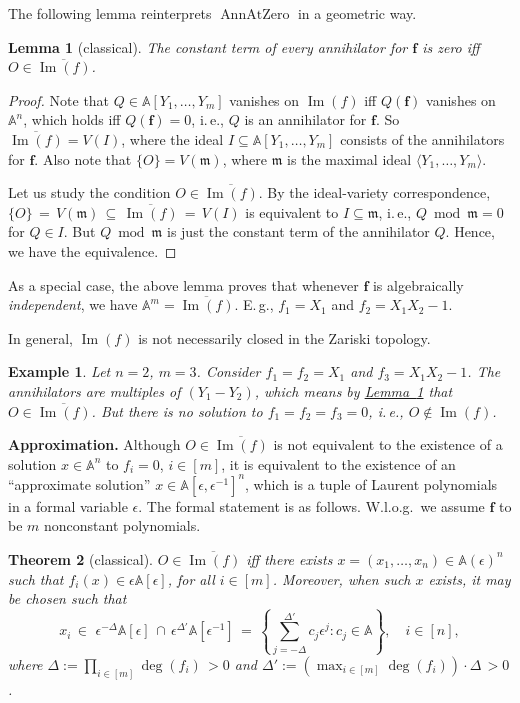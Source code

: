 \documentclass[11pt]{article}
\numberwithin{equation}{section}
\newtheorem{theorem}{Theorem}[section]
\newtheorem{lemma}[theorem]{Lemma}
\theoremstyle{definition}
\theoremstyle{plain}
\newcommand{\ie}{i.\,e.}
\newcommand{\Eg}{E.\,g.}
\newcommand{\expref}[2]{\hyperref[#2]{#1~\ref{#2}}}
\newtheorem{exmp}{Example}
\newcommand{\aff}{\mathbb{A}}
\DeclareMathOperator{\im}{\mathrm{Im}}
\newcommand{\ol}[1]{\overline{#1}}
\newcommand{\m}{\mathfrak{m}}
\DeclareMathOperator{\AnnAtZero}{\mathrm{AnnAtZero}\xspace} %
\begin{document}
The following lemma reinterprets $\AnnAtZero$ in a geometric way.
 \begin{lemma}[classical]\label{lem_geom}
 The constant term of every annihilator for $\mathbf f$ is zero iff $O\in \overline{\im(f)}$. %
 \end{lemma}
 \begin{proof}
 Note that %
 $Q\in \aff[Y_1,\dots,Y_m]$ vanishes on $\im(f)$ iff $Q(\mathbf f)$ vanishes on $\aff^n$, which holds iff $Q(\mathbf f)=0$, \ie, $Q$ is an annihilator for $\mathbf f$. So $\overline{\im(f)}=V(I)$, where the ideal $I\subseteq \aff[Y_1,\dots,Y_m]$ consists of the annihilators for $\mathbf f$. Also note that $\{O\}=V(\m)$, where $\m$ is the maximal ideal $\langle Y_1,\dots, Y_m\rangle$.

Let us study the condition $O\in \overline{\im(f)}$.
 By the ideal-variety correspondence, $\{O\} \,=\, V(\m) \,\subseteq\, \overline{\im(f)} \,=\, V(I)$ is equivalent to $I\subseteq \m$, \ie,  $Q\bmod \m=0$ for  $Q\in I$. But $Q\bmod \m$ is just the constant term of the annihilator $Q$. Hence, we have the equivalence.
 \end{proof}
 
%
%
As a special case,
%
the above lemma proves that
whenever $\mathbf f$
%
is  %
algebraically \emph{independent}, we have $\aff^m=\ol{\im(f)}$. \Eg, $f_1=X_1$ and $f_2=X_1 X_2-1$. 
%

In general, %
$\im(f)$ is not necessarily closed in the Zariski topology. 
\begin{exmp}\label{exmp_closure}
Let $n=2$, $m=3$. Consider $f_1=f_2=X_1$ and $f_3=X_1 X_2-1$. The annihilators are multiples of $(Y_1-Y_2)$, which means by \expref{Lemma}{lem_geom} that $O\in \ol{\im(f)}$. But there is no solution to $f_1=f_2=f_3=0$, \ie, $O\notin \im(f)$.
\end{exmp}

\noindent
\textbf{Approximation.} Although $O\in \overline{\im(f)}$ is not equivalent to the existence of a solution $x\in \aff^n$ to $f_i=0$, $i\in[m]$, it is equivalent to the existence of an  ``approximate solution'' $x\in \aff[\epsilon,\epsilon^{-1}]^n$, which is a tuple of Laurent polynomials in a formal variable $\epsilon$. The formal statement is as follows. W.l.o.g.\ we assume $\mathbf f$ to be $m$ nonconstant polynomials.

\begin{theorem}[classical]\label{thm_approx}
$O\in \overline{\im(f)}$ iff there exists $x=(x_1,\dots,x_n)\in \aff(\epsilon)^n$ such that $f_i(x)\in \epsilon \aff[\epsilon]$, for all $i\in [m]$. Moreover, when such $x$ exists, it may be chosen such that
\[
x_i \,\in\,\, \epsilon^{-\Delta} \aff[\epsilon] \,\cap\, \epsilon^{\Delta'} \aff[\epsilon^{-1}] \,=\, \left\{\sum_{j=-\Delta}^{\Delta'} c_j \epsilon^j: c_j\in \aff\right\}, \quad i\in[n],
\]
where $\Delta:=\prod_{i\in[m]} \deg(f_i) \,>0$ and $\Delta':=(\max_{i\in[m]} \deg(f_i))\cdot \Delta \,>0$.
\end{theorem}
\end{document}
